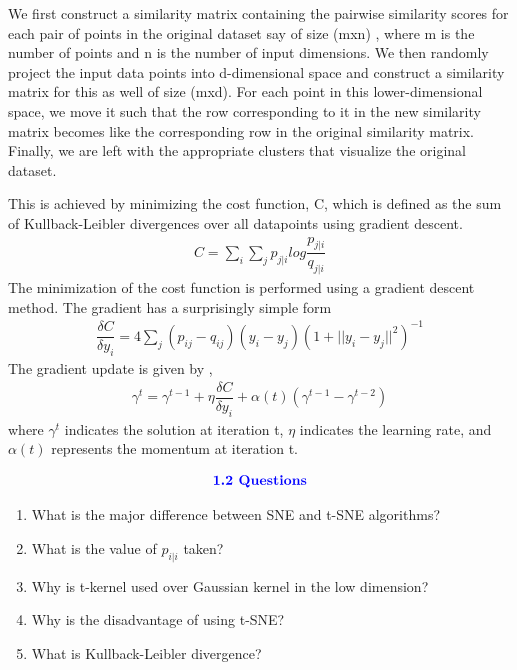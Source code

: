 \documentclass[12pt,a4paper]{article}
\begin{document}
{We first construct a similarity matrix containing the pairwise similarity scores for each pair of points in the original dataset say of size (mxn) , where m is the number of points and n is the number of input dimensions. We then randomly project the input data points into d-dimensional space and construct a similarity matrix for this as well of size (mxd). For each point in this lower-dimensional space, we move it such that the row corresponding to it in the new similarity matrix becomes like the corresponding row in
the original similarity matrix. Finally, we are left with the appropriate clusters that visualize the original
dataset.

This is achieved by minimizing the cost function, C, which is defined as the sum of Kullback-Leibler divergences over all datapoints using gradient descent.
\begin{align*}
    C = \sum_i\sum_j{p_{j|i} log\dfrac{p_{j|i}}{q_{j|i}}}
\end{align*}
The minimization of the cost function is performed using a gradient descent method.
The gradient has a surprisingly simple form
\begin{align*}
    \dfrac{\delta C}{\delta y_i} = 4 \sum_j{(p_{ij} - q_{ij})(y_i - y_j)(1+ ||y_i - y_j||^2)^{-1}}
\end{align*}
The gradient update is given by ,
\begin{align*}
    \gamma^{t} = \gamma^{t-1} + \eta \dfrac{\delta C}{\delta y_i} + \alpha(t)(\gamma^{t-1} - \gamma^{t-2})
\end{align*}
where $\gamma^t$ indicates the solution at iteration t, $\eta$ indicates the learning rate, and $\alpha(t)$ represents the momentum at iteration t.

\begin{align*}
    \textcolor{blue}{\text{{\textbf{1.2 Questions}}}}
\end{align*}

\begin{enumerate}
    \item What is the major difference between SNE and t-SNE algorithms?
    \item  What is the value of $p_{i|i}$ taken?
    \item Why is t-kernel used over Gaussian kernel in the low dimension?
    \item Why is the disadvantage of using t-SNE?
    \item What is  Kullback-Leibler divergence?\\[10pt]
\end{enumerate}


}
\end{document}
